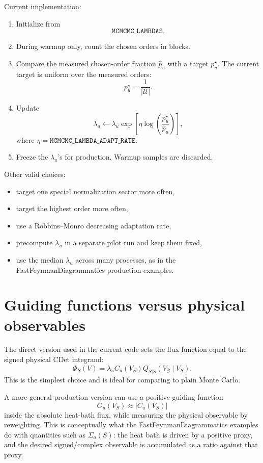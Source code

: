 \documentclass[11pt]{article}
\newcommand{\1}{\mathbf{1}}
\newcommand{\calU}{\mathcal{U}}
\begin{document}
Current implementation:
\begin{enumerate}[leftmargin=2em]
  \item Initialize from
  \[
    \texttt{MCMCMC\_LAMBDAS}.
  \]
  \item During warmup only, count the chosen orders in blocks.
  \item Compare the measured chosen-order fraction \(\hat p_u\) with a target
  \(p_u^\star\).  The current target is uniform over the measured orders:
  \[
    p_u^\star=\frac{1}{|\calU|}.
  \]
  \item Update
  \[
    \lambda_u
    \leftarrow
    \lambda_u
    \exp\left[
      \eta\log\left(\frac{p_u^\star}{\hat p_u}\right)
    \right],
  \]
  where \(\eta=\texttt{MCMCMC\_LAMBDA\_ADAPT\_RATE}\).
  \item Freeze the \(\lambda_u\)'s for production.  Warmup samples are
  discarded.
\end{enumerate}

Other valid choices:
\begin{itemize}[leftmargin=2em]
  \item target one special normalization sector more often,
  \item target the highest order more often,
  \item use a Robbins--Monro decreasing adaptation rate,
  \item precompute \(\lambda_u\) in a separate pilot run and keep them fixed,
  \item use the median \(\lambda_u\) across many processes, as in the
  FastFeynmanDiagrammatics production examples.
\end{itemize}

\section{Guiding functions versus physical observables}

The direct version used in the current code sets the flux function equal to
the signed physical CDet integrand:
\[
  \Phi_S(V)=\lambda_u C_u(V_S)Q_{\bar S|S}(V_{\bar S}\mid V_S).
\]
This is the simplest choice and is ideal for comparing to plain Monte Carlo.

A more general production version can use a positive guiding function
\[
  G_u(V_S)\approx |C_u(V_S)|
\]
inside the absolute heat-bath flux, while measuring the physical observable by
reweighting.  This is conceptually what the FastFeynmanDiagrammatics examples
do with quantities such as \(\Sigma_a(S)\): the heat bath is driven by a
positive proxy, and the desired signed/complex observable is accumulated as a
ratio against that proxy.
\end{document}
